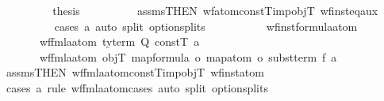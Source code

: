 \begin{isabellebody}
\ \ \ \ \ \ \isamarkupfalse%
\ \isamarkupfalse%
\ {\isacharquery}{\kern0pt}thesis\isanewline
\ \ \ \ \ \ \ \ \isamarkupfalse%
\ assms{\isacharbrackleft}{\kern0pt}THEN\ wf{\isacharunderscore}{\kern0pt}atom{\isacharunderscore}{\kern0pt}constT{\isacharunderscore}{\kern0pt}imp{\isacharunderscore}{\kern0pt}objT{\isacharbrackright}{\kern0pt}\ wf{\isacharunderscore}{\kern0pt}inst{\isacharunderscore}{\kern0pt}eq{\isacharunderscore}{\kern0pt}aux{\isacharprime}{\kern0pt}\isanewline
\ \ \ \ \ \ \ \ \isamarkupfalse%
\ {\isacharparenleft}{\kern0pt}cases\ a{\isacharsemicolon}{\kern0pt}\ auto\ split{\isacharcolon}{\kern0pt}\ option{\isachardot}{\kern0pt}splits{\isacharparenright}{\kern0pt}\isanewline
\isanewline
\ \ \ \ \isamarkupfalse%
%
\endisatagproof
{\isafoldproof}%
%
\isadelimproof
\isanewline
%
\endisadelimproof
\isanewline
\ \ \ \ \isamarkupfalse%
\ wf{\isacharunderscore}{\kern0pt}inst{\isacharunderscore}{\kern0pt}formula{\isacharunderscore}{\kern0pt}atom{\isacharcolon}{\kern0pt}\isanewline
\ \ \ \ \ \ \ {\isachardoublequoteopen}wf{\isacharunderscore}{\kern0pt}fmla{\isacharunderscore}{\kern0pt}atom\ {\isacharparenleft}{\kern0pt}ty{\isacharunderscore}{\kern0pt}term\ Q\ constT{\isacharparenright}{\kern0pt}\ a{\isachardoublequoteclose}\isanewline
\ \ \ \ \ \ \ {\isachardoublequoteopen}wf{\isacharunderscore}{\kern0pt}fmla{\isacharunderscore}{\kern0pt}atom\ objT\ {\isacharparenleft}{\kern0pt}{\isacharparenleft}{\kern0pt}map{\isacharunderscore}{\kern0pt}formula\ o\ map{\isacharunderscore}{\kern0pt}atom\ o\ subst{\isacharunderscore}{\kern0pt}term{\isacharparenright}{\kern0pt}\ f\ a{\isacharparenright}{\kern0pt}{\isachardoublequoteclose}\isanewline
%
\isadelimproof
\ \ \ \ \ \ %
\endisadelimproof
%
\isatagproof
{}\isamarkupfalse%
\ assms{\isacharbrackleft}{\kern0pt}THEN\ wf{\isacharunderscore}{\kern0pt}fmla{\isacharunderscore}{\kern0pt}atom{\isacharunderscore}{\kern0pt}constT{\isacharunderscore}{\kern0pt}imp{\isacharunderscore}{\kern0pt}objT{\isacharbrackright}{\kern0pt}\ wf{\isacharunderscore}{\kern0pt}inst{\isacharunderscore}{\kern0pt}atom\isanewline
\ \ \ \ \ \ \isamarkupfalse%
\ {\isacharparenleft}{\kern0pt}cases\ a\ rule{\isacharcolon}{\kern0pt}\ wf{\isacharunderscore}{\kern0pt}fmla{\isacharunderscore}{\kern0pt}atom{\isachardot}{\kern0pt}cases{\isacharsemicolon}{\kern0pt}\ auto\ split{\isacharcolon}{\kern0pt}\ option{\isachardot}{\kern0pt}splits{\isacharparenright}{\kern0pt}\isanewline

\end{isabellebody}
